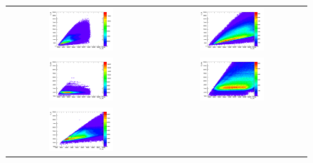 \begin{figure}[bh]
  \begin{center}
    \begin{tabular}{cc}
      \includegraphics[width=0.45\textwidth]{chapters/Zprime/Saturation/images/FlatPt/Sample_variables/Emc_E24_Barrel.png} &
      \includegraphics[width=0.45\textwidth]{chapters/Zprime/Saturation/images/FlatPt/Sample_variables/Emc_E24_Endcap.png} \\
      \includegraphics[width=0.45\textwidth]{chapters/Zprime/Saturation/images/FlatPt/Sample_variables/Emc_Emax_Barrel.png} &
      \includegraphics[width=0.45\textwidth]{chapters/Zprime/Saturation/images/FlatPt/Sample_variables/Emc_Emax_Endcap.png} \\
      \includegraphics[width=0.45\textwidth]{chapters/Zprime/Saturation/images/FlatPt/Sample_variables/Emc_Esc_Barrel.png} &

\end{tabular}
\end{center}
\end{figure}
